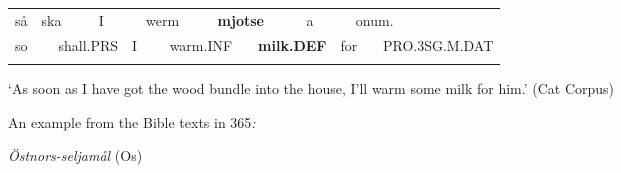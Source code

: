 \begin{tabular}{llllllllllllll}
\lsptoprule
så & \multicolumn{2}{l}{ska

} & \multicolumn{2}{l}{I

} & \multicolumn{2}{l}{werm

} & \multicolumn{2}{l}{{\bfseries mjotse}

} & \multicolumn{2}{l}{a

} & \multicolumn{2}{l}{onum.

} & \\
\multicolumn{2}{l}{so

} & \multicolumn{2}{l}{shall.PRS

} & \multicolumn{2}{l}{I

} & \multicolumn{2}{l}{warm.INF

} & \multicolumn{2}{l}{{\bfseries milk.DEF}

} & \multicolumn{2}{l}{for

} & \multicolumn{2}{l}{PRO.3SG.M.DAT

}\\
\lspbottomrule
\end{tabular}

\begin{styleTranslation}
‘As soon as I have got the wood bundle into the house, I’ll warm some milk for him.’ (Cat Corpus)

\end{styleTranslation}

\begin{styleBodyTextFirst}
An example from the Bible texts in 365\textit{:}

\end{styleBodyTextFirst}

\begin{listWWNumileveli}
\item {}

\begin{styleExample}
\label{bkm:Ref123968060}\textit{Östnors-seljamål} (Os)

\end{styleExample}

\end{listWWNumileveli}

